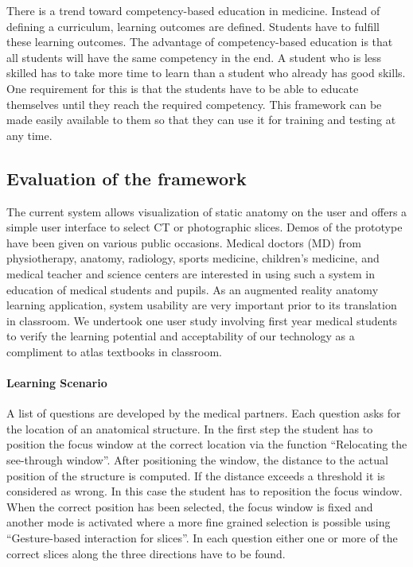 {{{{{There is a trend toward competency-based education in medicine. Instead of defining a curriculum, learning outcomes are defined. Students have to fulfill these learning outcomes. The advantage of competency-based education is that all students will have the same competency in the end. A student who is less skilled has to take more time to learn than a student who already has good skills. One requirement for this is that the students have to be able to educate themselves until they reach the required competency. 
This framework can be made easily available to them so that they can use it for training and testing at any time.
	
\subsection{Evaluation of the framework}
The current system allows visualization of static anatomy on the user and offers a simple user interface to select CT or photographic slices. Demos of the prototype have been given on various public occasions. Medical doctors (MD) from physiotherapy, anatomy, radiology, sports medicine, children's medicine, and medical teacher and science centers are interested in using such a system in education of medical students and pupils. 
As an augmented reality anatomy learning application, system usability are very important prior to its translation in classroom. We undertook one user study involving first year medical students to verify the learning potential and acceptability of our technology as a compliment to atlas textbooks in classroom.

\paragraph{Learning Scenario} A list of questions are developed by the medical partners. Each question asks for the location of an anatomical structure. 
In the first step the student has to position the focus window at the correct location via the function ``Relocating the see-through window''. After positioning the window, the distance to the actual position of the structure is computed. If the distance exceeds a threshold it is considered as wrong. In this case the student has to reposition the focus window. When the correct position has been selected, the focus window is fixed and another mode is activated where a more fine grained selection is possible using ``Gesture-based interaction for slices''. 
In each question either one or more of the correct slices along the three directions have to be found. 

}}}}}
